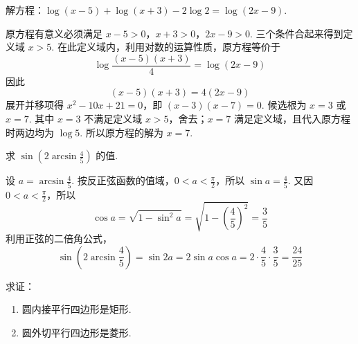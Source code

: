 \begin{problem}
解方程：\(\log\left(x-5\right)+\log\left(x+3\right)-2\log2=\log\left(2x-9\right)\).
\end{problem}

\begin{solution}
原方程有意义必须满足 \(x-5>0\)，\(x+3>0\)，\(2x-9>0\).
三个条件合起来得到定义域 \(x>5\). 在此定义域内，利用对数的运算性质，原方程等价于
\[
\log\frac{\left(x-5\right)\left(x+3\right)}{4}=\log\left(2x-9\right)
\]
因此
\[
\left(x-5\right)\left(x+3\right)=4\left(2x-9\right)
\]
展开并移项得 \(x^2-10x+21=0\)，即 \(\left(x-3\right)\left(x-7\right)=0\).
候选根为 \(x=3\) 或 \(x=7\). 其中 \(x=3\) 不满足定义域 \(x>5\)，舍去；\(x=7\) 满足定义域，且代入原方程时两边均为 \(\log5\). 所以原方程的解为 \(x=7\).
\end{solution}

\begin{problem}
求 \(\sin\left(2\arcsin\frac45\right)\) 的值.
\end{problem}

\begin{solution}
设 \(a=\arcsin\frac45\). 按反正弦函数的值域，\(0<a<\frac{\pi}{2}\)，所以
\(\sin a=\frac45\). 又因 \(0<a<\frac{\pi}{2}\)，所以
\[
\cos a=\sqrt{1-\sin^2a}=\sqrt{1-\left(\frac45\right)^2}=\frac35
\]
利用正弦的二倍角公式，
\[
\sin\left(2\arcsin\frac45\right)=\sin2a=2\sin a\cos a=2\cdot\frac45\cdot\frac35=\frac{24}{25}
\]
\end{solution}

\begin{problem}
求证：

\begin{enumerate}
\item 圆内接平行四边形是矩形.
\item 圆外切平行四边形是菱形.
\end{enumerate}
\end{problem}

